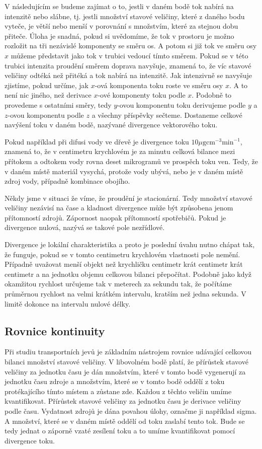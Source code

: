 \documentclass[12pt]{article}
\begin{document}
V následujícím se budeme zajímat o to, jestli v daném bodě tok nabírá na intenzitě nebo slábne, tj. jestli množství stavové veličiny, které z daného bodu vyteče, je větší nebo menší v porovnání s množstvím, které za stejnou dobu přiteče. Úloha je snadná, pokud si uvědomíme, že tok v prostoru je možno rozložit na tři nezávislé komponenty se směru os. A potom si již tok ve směru osy $x$ můžeme představit jako tok v trubici vedoucí tímto směrem. Pokud se v této trubici intenzita proudění směrem doprava navyšuje, znamená to, že víc stavové veličiny odtéká než přitéká a tok nabírá na intenzitě. Jak intenzivně se navyšuje zjistíme, pokud určíme, jak $x$-ová komponenta toku roste ve směru osy $x$. A to není nic jiného, než derivace $x$-ové komponenty toku podle $x$. Podobně to provedeme s ostatními směry, tedy $y$-ovou komponentu toku derivujeme podle $y$ a $z$-ovou komponentu podle $z$ a všechny příspěvky sečteme. Dostaneme celkové navýšení toku v daném bodě, nazývané divergence vektorového toku. 

Pokud například při difusi vody ve dřevě je divergence toku $10\mu \mathrm g \mathrm {cm}^{-3} \mathrm {min}^{-1}$, znamená to, že v centimetru krychlovém je za minutu celková bilance mezi přítokem a odtokem vody rovna deset mikrogramů ve prospěch toku ven. Tedy, že v daném místě materiál vysychá, protože vody ubývá, nebo je v daném místě zdroj vody, případně kombinace obojího. 

Někdy jsme v situaci že víme, že proudění je stacionární. Tedy množství stavové veličiny nezávisí na čase a kladnost divergence může být způsobena jenom přítomností zdrojů. Zápornost naopak přítomností spotřebičů. Pokud je divergence nulová, nazývá se takové pole nezřídlové.

Divergence je lokální charakteristika a proto je poslední úvahu nutno chápat tak, že funguje, pokud se v tomto centimetru krychlovém vlastnosti pole nemění. Případně uvažovat menší objekt než krychličku centimetr krát centimetr krát centimetr a na jednotku objemu celkovou bilanci přepočítat. Podobně jako když okamžitou rychlost určujeme tak v meterech za sekundu tak, že počítáme průměrnou rychlost na velmi krátkém intervalu, kratším než jedna sekunda. V limitě dokonce na intervalu nulové délky.


\subsection{Rovnice kontinuity}

Při studiu transportních jevů je základním nástrojem rovnice udávající celkovou bilanci množství stavové veličiny. V libovolném bodě platí, že přírůstek stavové veličiny za jednotku času je dán množstvím, které v tomto bodě vygenerují za jednotku času zdroje a množstvím, které se v tomto bodě oddělí z toku protékajícího tímto místem a zůstane zde. Každou z těchto veličin umíme kvantifikovat. Přírůstek stavové veličiny za jednotku času je derivace veličiny podle času. Vydatnost zdrojů je dána povahou úlohy, označme ji například sigma. A množství, které se v daném místě oddělí od toku zaslabí tento tok. Bude se tedy jednat o záporně vzaté zesílení toku a to umíme kvantifikovat pomocí divergence toku.
\end{document}
